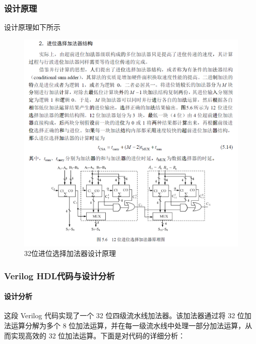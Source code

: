 \documentclass[12pt,hyperref,a4paper,UTF8]{ctexart}
\begin{document}
\subsubsection{设计原理}
  设计原理如下所示

    \begin{figure}[H]
        \centering
        \includegraphics[width =1.0\textwidth]{figures/fig/Snipaste_2024-09-23_08-54-27.png}
        \caption{32位进位选择加法器设计原理}
        \label{fig:enter-label}
    \end{figure}



\subsubsection{Verilog HDL代码与设计分析}
\paragraph{设计分析}
这段 Verilog 代码实现了一个 32 位四级流水线加法器。该加法器通过将 32 位加法运算分解为多个 8 位加法运算，并在每一级流水线中处理一部分加法运算，从而实现高效的 32 位加法运算。下面是对代码的详细分析：
\end{document}
